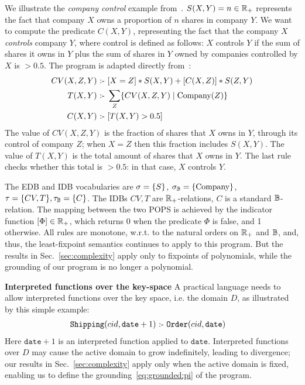 \begin{ex} We illustrate the {\em company control} example
  from~\cite[Example 3.2]{DBLP:conf/pods/RossS92}.
  $S(X,Y)=n \in \mathbb R_+$ represents the fact that company $X$ owns a
  proportion of $n$ shares in company $Y$.  We want to compute the
  predicate $C(X,Y)$, representing the fact that the company $X$ {\em
    controls} company $Y$, where control is defined as follows: $X$
  controls $Y$ if the sum of shares it owns in $Y$ plus the sum of
  shares in $Y$ owned by companies controlled by $X$ is $>0.5$.  The
  program is adapted directly from~\cite{DBLP:conf/pods/RossS92}:
  \begin{align*}
    CV(X,Z,Y) \text{ :- } & [X=Z]*S(X,Y) + [C(X,Z)]*S(Z,Y) \\
    T(X,Y) \text{ :- } & \sum_Z \{{CV(X,Z,Y)}\mid{\text{Company}(Z)}\} \\
    C(X,Y) \text{ :- } & [T(X,Y) > 0.5]
  \end{align*}
  The value of $CV(X,Z,Y)$ is the fraction of shares that $X$ owns in
  $Y$, through its control of company $Z$; when $X=Z$ then this
  fraction includes $S(X,Y)$.  The value of $T(X,Y)$ is the total
  amount of shares that $X$ owns in $Y$.  The last rule checks whether
  this total is $>0.5$: in that case, $X$ controls $Y$.

  The EDB and IDB vocabularies are $\sigma = \{S\}$,
  $\sigma_\mathbb B = \{\text{Company}\}$,
  $\tau = \{CV, T\}, \tau_\mathbb B = \{C\}$.  The IDBs $CV, T$ are
  $\mathbb R_+$-relations, $C$ is a standard $\mathbb B$-relation.  The mapping
  between the two POPS is achieved by the indicator function
  $[\Phi] \in \mathbb R_+$, which returns 0 when the predicate $\Phi$ is
  false, and 1 otherwise.  All rules are monotone, w.r.t. to the
  natural orders on $\mathbb R_+$ and $\mathbb B$, and, thus, the least-fixpoint
  semantics continues to apply to this program. But the results in
  Sec.~\ref{sec:complexity} apply only to fixpoints of polynomials,
  while the grounding of our program is no longer a polynomial.
\end{ex}


{\bf Interpreted functions over the key-space} A practical language
needs to allow interpreted functions over the key space, i.e. the
domain $D$, as illustrated by this simple example:
\begin{align*}
  \texttt{Shipping}(cid,\texttt{date}+1) \text{ :- } & \texttt{Order}(cid,\texttt{date})
\end{align*}
Here $\texttt{date}+1$ is an interpreted function applied to
$\texttt{date}$.  Interpreted functions over $D$ may cause the active
domain to grow indefinitely, leading to divergence; our results in
Sec.~\ref{sec:complexity} apply only when the active domain is fixed,
enabling us to define the grounding~\eqref{eq:grounded:pi} of the
\datalogo program.

